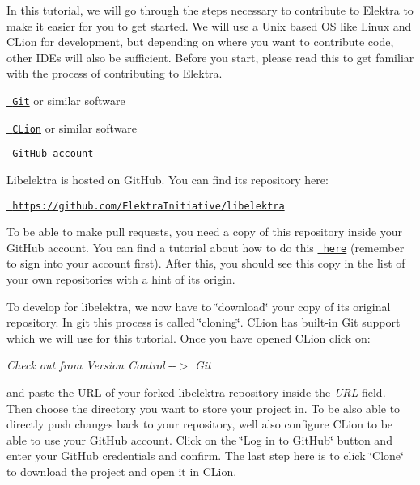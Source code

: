 In this tutorial, we will go through the steps necessary to contribute to Elektra to make it easier for you to get started. We will use a Unix based OS like Linux and C\+Lion for development, but depending on where you want to contribute code, other I\+D\+Es will also be sufficient. Before you start, please read this to get familiar with the process of contributing to Elektra.


\begin{DoxyItemize}
\item \href{https://git-scm.com/download}{\texttt{ Git}} or similar software
\item \href{https://www.jetbrains.com/clion/}{\texttt{ C\+Lion}} or similar software
\item \href{https://github.com/}{\texttt{ Git\+Hub account}}
\end{DoxyItemize}

Libelektra is hosted on Git\+Hub. You can find its repository here\+:


\begin{DoxyItemize}
\item \href{https://github.com/ElektraInitiative/libelektra}{\texttt{ https\+://github.\+com/\+Elektra\+Initiative/libelektra}}
\end{DoxyItemize}

To be able to make pull requests, you need a copy of this repository inside your Git\+Hub account. You can find a tutorial about how to do this \href{https://help.github.com/en/articles/fork-a-repo}{\texttt{ here}} (remember to sign into your account first). After this, you should see this copy in the list of your own repositories with a hint of it\textquotesingle{}s origin.

To develop for libelektra, we now have to \char`\"{}download\char`\"{} your copy of its original repository. In git this process is called \char`\"{}cloning\char`\"{}. C\+Lion has built-\/in Git support which we will use for this tutorial. Once you have opened C\+Lion click on\+:

{\itshape Check out from Version Control} -\/-\/$>$ {\itshape Git}

and paste the U\+RL of your forked libelektra-\/repository inside the {\itshape U\+RL} field. Then choose the directory you want to store your project in. To be also able to directly push changes back to your repository, we\textquotesingle{}ll also configure C\+Lion to be able to use your Git\+Hub account. Click on the \char`\"{}\+Log in to Git\+Hub\char`\"{} button and enter your Git\+Hub credentials and confirm. The last step here is to click \char`\"{}\+Clone\char`\"{} to download the project and open it in C\+Lion.

